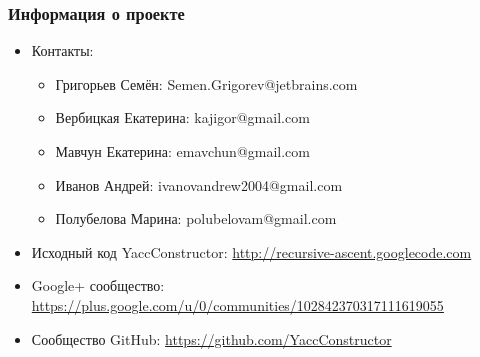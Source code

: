 \documentclass{beamer}
\begin{document}
\begin{frame}
	\transwipe[direction=90]
	\frametitle{Информация о проекте}
	\begin{itemize}
		\item Контакты: 
        \begin{itemize}
            \item Григорьев Семён: Semen.Grigorev@jetbrains.com
            \item Вербицкая Екатерина: kajigor@gmail.com
            \item Мавчун Екатерина: emavchun@gmail.com
            \item Иванов Андрей: ivanovandrew2004@gmail.com
            \item Полубелова Марина: polubelovam@gmail.com
        \end{itemize}
		\item Исходный код YaccConstructor: \href{http://recursive-ascent.googlecode.com}{http://recursive-ascent.googlecode.com}
		\item Google+ сообщество: \href{https://plus.google.com/u/0/communities/102842370317111619055}{https://plus.google.com/u/0/communities/102842370317111619055}
		\item Сообщество GitHub: \href{https://github.com/YaccConstructor}{https://github.com/YaccConstructor}
	\end{itemize}
\end{frame}
\end{document}
